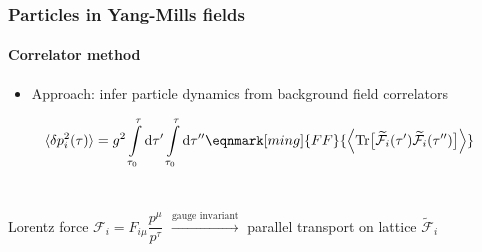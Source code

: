 \documentclass[aspectratio=169,11pt,usenames,dvipsnames]{beamer}
\begin{document}
\begin{frame}
    \frametitle{Particles in Yang-Mills fields}
    \framesubtitle{Correlator method}
        \begin{itemize}
            \item \begin{center}{{\color{ming}Approach}: infer particle dynamics from background {\color{ming}field correlators}} \end{center}
        \end{itemize} 
        \renewcommand{\eqnhighlightheight}{\vphantom{x}}
        \begin{equation*}
            \langle \delta p^2_i(\tau)\rangle= g^2 \int\limits_{\tau_0}^{\tau}\mathrm{d}\tau^{\prime}\int\limits_{\tau_0}^{\tau}\mathrm{d}\tau^{\prime\prime}\eqnmark[ming]{FF}{\Big\langle \mathrm{Tr}\big[\widetilde{\mathcal{F}}_i(\tau^{\prime})\widetilde{\mathcal{F}}_i(\tau^{\prime\prime})\big]\Big\rangle}
        \end{equation*}
        \\[20pt]
        \begin{center}
            {\footnotesize
            Lorentz force $\mathcal{F}_i=F_{i\mu}\dfrac{p^\mu}{p^\tau}$ $\xrightarrow{\text{gauge invariant}}$ parallel transport on lattice $\widetilde{\mathcal{F}}_i$}
        \end{center}


\end{frame}
\end{document}
